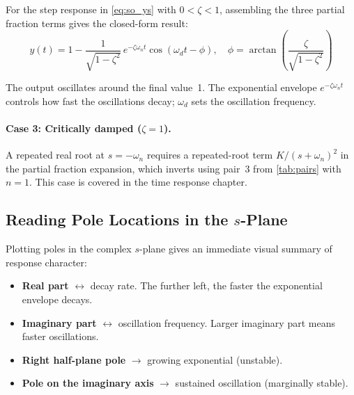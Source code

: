 \documentclass[../../book.tex]{subfiles}
\begin{document}
For the step response in \cref{eq:so_ys} with $0 < \zeta < 1$, assembling the
three partial fraction terms gives the closed-form result:
\begin{equation}
  \boxed{y(t) = 1 - \frac{1}{\sqrt{1-\zeta^2}}\,e^{-\zeta\omega_n t}
    \cos\!\left(\omega_d t - \phi\right),
  \quad \phi = \arctan\!\left(\frac{\zeta}{\sqrt{1-\zeta^2}}\right)}
  \label{eq:so_response}
\end{equation}

The output oscillates around the final value~1.  The exponential envelope
$e^{-\zeta\omega_n t}$ controls how fast the oscillations decay; $\omega_d$
sets the oscillation frequency.


\paragraph{Case 3: Critically damped ($\zeta = 1$).}  A repeated real root
at $s = -\omega_n$ requires a repeated-root term $K/(s+\omega_n)^2$ in the
partial fraction expansion, which inverts using pair~3 from \cref{tab:pairs}
with $n = 1$.  This case is covered in the time response chapter.

\subsection{Reading Pole Locations in the $s$-Plane}
\label{sec:splane}

Plotting poles in the complex $s$-plane gives an immediate visual summary of
response character:

\begin{itemize}
  \item \textbf{Real part} $\leftrightarrow$ decay rate.  The further left, the
    faster the exponential envelope decays.
  \item \textbf{Imaginary part} $\leftrightarrow$ oscillation frequency.
    Larger imaginary part means faster oscillations.
  \item \textbf{Right half-plane pole} $\rightarrow$ growing exponential
    (unstable).
  \item \textbf{Pole on the imaginary axis} $\rightarrow$ sustained oscillation
    (marginally stable).
\end{itemize}
\end{document}
